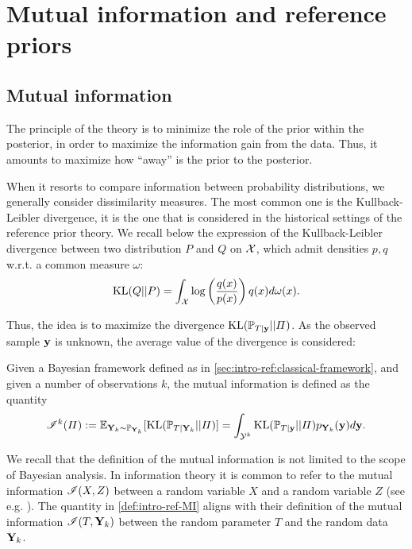 
\section{Mutual information and reference priors}\label{sec:intro-ref:mutalinfo-ref-priors}

\subsection{Mutual information}\label{sec:intro-ref:mutualinfo}


The principle of the theory 
is to minimize the role of the prior within the posterior, in order to maximize the information gain from the data.
Thus, it amounts to maximize how ``away'' is the prior to the posterior.

When it resorts to compare information between probability distributions, we generally consider dissimilarity measures. The most common one is the Kullback-Leibler divergence, it is the one that is considered in the historical settings of the reference prior theory.
We recall below the expression of the Kullback-Leibler divergence between two distribution $P$ and $Q$ on $\mathcal{X}$, which admit densities $p,q$ w.r.t. a common measure $\omega$:
    \begin{equation}
        \text{KL}(Q||P)=\int_{\mathcal{X}}\log\left(\frac{q(x)}{p(x)}\right)q(x)d\omega(x).
    \end{equation}

Thus, the idea is to maximize the divergence $\text{KL}(\mathbb{P}_{T|\mathbf{y}}||\varPi)$. As the observed sample $\mathbf{y}$ is unknown, the average value of the divergence is considered:
\begin{defi}\label{def:intro-ref-MI}
    Given a Bayesian framework defined as in \cref{sec:intro-ref:classical-framework}, and given a number of observations $k$, the mutual information is defined as the quantity
    \begin{equation}
        \mathscr{I}^k(\varPi) :=  \mathbb{E}_{\mathbf{Y}_k\sim \mathbb{P}_{\mathbf{Y}_k}}[\text{KL}(\mathbb{P}_{T|\mathbf{Y}_k}||\varPi)] =  \int_{\mathcal{Y}^k}\text{KL}(\mathbb{P}_{T|\mathbf{y}}||\varPi) p_{\mathbf{Y}_k}(\mathbf{y})d\mathbf{y}.
    \end{equation}
\end{defi}



We recall that the definition of the mutual information is not limited to the scope of Bayesian analysis. In information theory it is common to refer to the mutual information $\mathscr{I}(X,Z)$ between a random variable $X$ and a random variable $Z$ (see e.g. \cite{mackay_information_2003}). The quantity in \cref{def:intro-ref-MI} aligns with their definition of the mutual information $\mathscr{I}(T,\mathbf{Y}_k)$ between the random parameter $T$ and the random data $\mathbf{Y}_k$.

